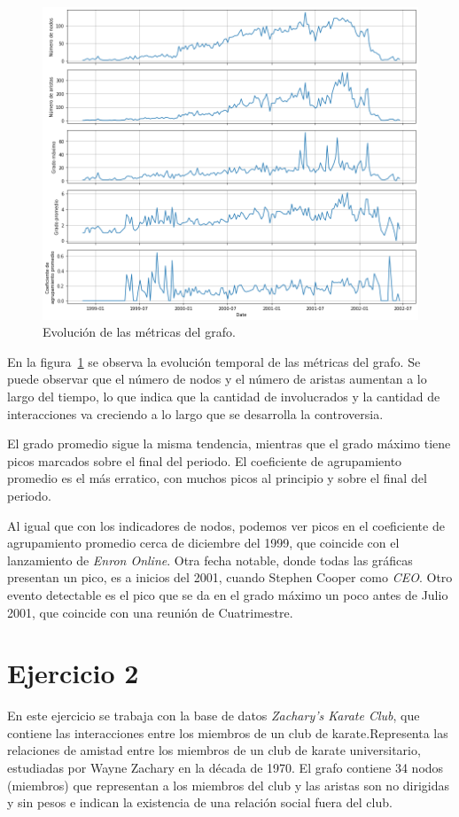 \documentclass{article}
\begin{document}
\begin{figure}[htb]
    \centering
    \includegraphics[width=\linewidth]{imagenes/ej1/metricas_grafo.png}
    \caption{Evolución de las métricas del grafo.}
    \label{fig:metricas_grafo}
\end{figure}

En la figura~\ref{fig:metricas_grafo} se observa la evolución temporal de las métricas del grafo. Se puede observar que el número de nodos y el número de aristas aumentan a lo largo del tiempo, lo que indica que la cantidad de involucrados y la cantidad de interacciones va creciendo a lo largo que se desarrolla la controversia.

El grado promedio sigue la misma tendencia, mientras que el grado máximo tiene picos marcados sobre el final del periodo. El coeficiente de agrupamiento promedio es el más erratico, con muchos picos al principio y sobre el final del periodo.

Al igual que con los indicadores de nodos, podemos ver picos en el coeficiente de agrupamiento promedio cerca de diciembre del 1999, que coincide con el lanzamiento de \emph{Enron Online}. Otra fecha notable, donde todas las gráficas presentan un pico, es a inicios del 2001, cuando Stephen Cooper como \emph{CEO}. Otro evento detectable es el pico que se da en el grado máximo un poco antes de Julio 2001, que coincide con una reunión de Cuatrimestre.

\section{Ejercicio 2} \label{sec: ej2}
En este ejercicio se trabaja con la base de datos \textit{Zachary's Karate Club}, que contiene las interacciones entre los miembros de un club de karate.Representa las relaciones de amistad entre los miembros de un club de karate universitario, estudiadas por Wayne Zachary en la década de 1970. El grafo contiene 34 nodos (miembros) que representan a los miembros del club y las aristas son no dirigidas y sin pesos e indican la existencia de una relación social fuera del club.
\end{document}
